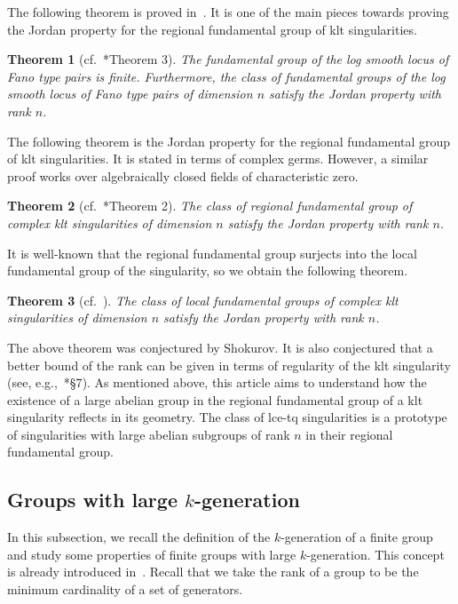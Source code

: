 \documentclass{amsart}
\newtheorem{theorem}{Theorem}[section]
\theoremstyle{remark}
\numberwithin{equation}{section}
\begin{document}
The following theorem is proved in~\cite{BFMS20}.
It is one of the main pieces towards proving the Jordan property
for the regional fundamental group of klt singularities.

\begin{theorem}[cf.~\cite{BFMS20}*{Theorem 3}]\label{thm:Jordan-log-smooth-proj}
The fundamental group of the log smooth locus of Fano type pairs is finite.
Furthermore, the class of fundamental groups of the log smooth locus of Fano type pairs of dimension $n$
satisfy the Jordan property with rank $n$.
\end{theorem}

The following theorem is the Jordan property for the regional fundamental group
of klt singularities. It is stated in terms of complex germs.
However, a similar proof works over algebraically closed fields of characteristic zero.

\begin{theorem}[cf.~\cite{BFMS20}*{Theorem 2}]\label{thm:jordan-klt}
The class of regional fundamental group of complex klt singularities of dimension $n$
satisfy the Jordan property with rank $n$.
\end{theorem}

It is well-known that the regional fundamental group surjects into the local fundamental group of the singularity, so we obtain the following theorem.

\begin{theorem}[cf.~\cite{BFMS20}]
The class of local fundamental groups of complex klt singularities
of dimension $n$ satisfy the Jordan property with rank $n$.
\end{theorem}

The above theorem was conjectured by Shokurov.
It is also conjectured that a better bound of the rank can be given in terms of regularity of the klt singularity (see, e.g.,~\cite{Sho00}*{\S 7}).
As mentioned above, this article aims to understand how the existence
of a large abelian group in the regional fundamental group of a klt singularity reflects in its geometry. The class of lce-tq singularities is a prototype of singularities
with large abelian subgroups of rank $n$ in their regional fundamental group.


\subsection{Groups with large $k$-generation}\label{subsec:k-gen}
In this subsection, we recall the definition of the $k$-generation of a finite group and study some properties of finite groups with large $k$-generation.
This concept is already introduced in~\cite{Mor20}.
Recall that we take the rank of a group to be the minimum cardinality of a set of generators.
\end{document}
